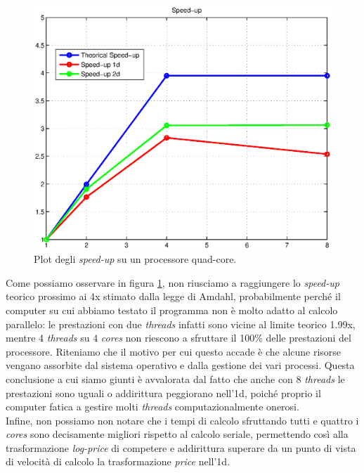 \documentclass[a4paper,10pt]{report}
\theoremstyle{plain}
\theoremstyle{definition}
\theoremstyle{remark}
\begin{document}
\begin{figure}[htp!]
\begin{center}
\includegraphics[width=12cm]{img/test4-speedup.eps}
\caption{Plot degli \emph{speed-up} su un processore quad-core.}
\label{test4:speedup}
\end{center}
\end{figure}
Come possiamo osservare in figura \ref{test4:speedup}, non riusciamo a raggiungere lo \emph{speed-up} teorico prossimo ai 4x stimato dalla legge di Amdahl, probabilmente perch\'e il computer su cui abbiamo testato il programma non \`e molto adatto al calcolo parallelo: le prestazioni con due \emph{threads} infatti sono vicine al limite teorico 1.99x, mentre 4 \emph{threads} su 4 \emph{cores} non riescono a sfruttare il 100\% delle prestazioni del processore. Riteniamo che il motivo per cui questo accade \`e che alcune risorse vengano assorbite dal sistema operativo e dalla gestione dei vari processi. Questa conclusione a cui siamo giunti \`e avvalorata dal fatto che anche con 8 \emph{threads} le prestazioni sono uguali o addirittura peggiorano nell'1d, poich\'e proprio il computer fatica a gestire molti \emph{threads} computazionalmente onerosi.\\Infine, non possiamo non notare che i tempi di calcolo sfruttando tutti e quattro i \emph{cores} sono decisamente migliori rispetto al calcolo seriale, permettendo cos\`i alla trasformazione \emph{log-price} di competere e addirittura superare da un punto di vista di velocit\`a di calcolo la trasformazione \emph{price} nell'1d.
\newpage
\end{document}
